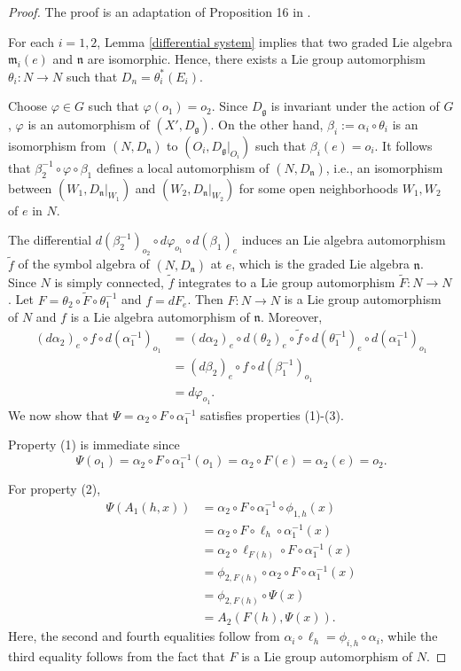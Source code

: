 \documentclass{amsart}
\theoremstyle{definition}
\theoremstyle{remark}
\newcommand{\g}{\mathfrak{g}}
\newcommand{\m}{\mathfrak{m}}
\newcommand{\n}{\mathfrak{n}}
\begin{document}
\begin{proof}
The proof is an adaptation of Proposition 16 in \cite{C}.

For each $i=1, 2$, Lemma \ref{differential system} implies that two graded Lie algebra $\m_i(e)$ and $\n$ are isomorphic. Hence, there exists a Lie group automorphism $\theta_i: N \to N$ such that $D_n = \theta_i^*(E_i)$.

Choose $\varphi \in G$ such that $\varphi(o_1) = o_2$. Since $D_\g$ is invariant under the action of $G$, $\varphi$ is an automorphism of $(X', D_\g)$. On the other hand, $\beta_i := \alpha_i \circ \theta_i$ is an isomorphism from $(N, D_\n)$ to $(O_i, D_\g|_{O_i})$ such that $\beta_i(e) = o_i$. It follows that $\beta_2^{-1} \circ \varphi \circ \beta_1$ defines a local automorphism of $(N, D_\n)$, i.e., an isomorphism between $(W_1, D_\n|_{W_1})$ and $(W_2, D_\n|_{W_2})$ for some open neighborhoods $W_1, W_2$ of $e$ in $N$. 

The differential $d (\beta_2^{-1})_{o_2} \circ d\varphi_{o_1} \circ d(\beta_1)_e$ induces an Lie algebra automorphism $\tilde{f}$ of the symbol algebra of $(N, D_\n)$ at $e$, which is the graded Lie algebra $\n$. Since $N$ is simply connected, $\tilde{f}$ integrates to a Lie group automorphism $\tilde{F} : N \to N$. Let $F = \theta_2 \circ \tilde{F} \circ \theta_1^{-1}$ and $f = dF_e$. Then $F:N \to N$ is a Lie group automorphism of $N$ and $f$ is a Lie algebra automorphism of $\n$. Moreover, 
\begin{align*}
(d\alpha_2)_e \circ f \circ d(\alpha_1^{-1})_{o_1} &=  (d\alpha_2)_e \circ d(\theta_2)_e \circ \tilde{f} \circ d(\theta_1^{-1})_{e} \circ d(\alpha_1^{-1})_{o_1}\\
&= (d\beta_2)_e \circ f \circ d(\beta_1^{-1})_{o_1}\\
&= d\varphi_{o_1}.
\end{align*}
We now show that $\Psi = \alpha_2 \circ F \circ \alpha_1^{-1}$ satisfies properties (1)-(3).

Property (1) is immediate since 
\[\Psi(o_1) = \alpha_2 \circ F \circ \alpha_1^{-1}(o_1) = \alpha_2\circ F(e) = \alpha_2(e) = o_2.\]

For property (2), 
\begin{align*}
\Psi(A_1(h, x)) &= \alpha_2\circ F \circ \alpha_1^{-1} \circ \phi_{1, h} (x)\\
&= \alpha_2 \circ F \circ \ell_h \circ \alpha_1^{-1}(x)\\
&= \alpha_2 \circ \ell_{F(h)} \circ F \circ \alpha_1^{-1}(x)\\
&= \phi_{2, F(h)} \circ \alpha_2 \circ F \circ \alpha_1^{-1}(x)\\
&= \phi_{2, F(h)} \circ \Psi(x)\\
&= A_2(F(h), \Psi(x)).
\end{align*}
Here, the second and fourth equalities follow from $\alpha_i \circ \ell_h = \phi_{i, h} \circ \alpha_i$, while the third equality follows from the fact that $F$ is a Lie group automorphism of $N$.


\end{proof}
\end{document}
